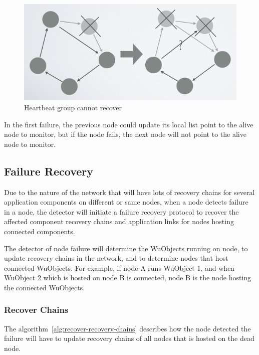 \begin{figure}[h!]
\label{fig:recovery-heartbeat-group-need-synchronization}
\caption{Heartbeat group cannot recover}
\centering
    \includegraphics[width=\linewidth]{figures/recovery-heartbeat-group-need-synchronization}
\end{figure}

In the first failure, the previous node could update its local list point to
the alive node to monitor, but if the node fails, the next node will not point
to the alive node to monitor.


\subsection{Failure Recovery}


Due to the nature of the network that will have lots of recovery chains for
several application components on different or same nodes, when a node detects
failure in a node, the detector will initiate a failure recovery protocol to
recover the affected component recovery chains and application links for
nodes hosting connected components.

The detector of node failure will determine the WuObjects running on node, to
update recovery chains in the network, and to determine nodes that host
connected WuObjects. For example, if node A runs WuObject 1, and when WuObject
2 which is hosted on node B is connected, node B is the node hosting the
  connected WuObjects.

\subsubsection{Recover Chains}

The algorithm~\ref{alg:recover-recovery-chains} describes how the node detected
the failure will have to update recovery chains of all nodes that is hosted on
the dead node.

